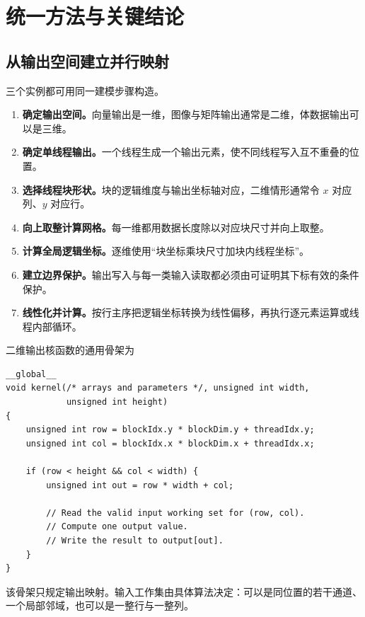 \section{统一方法与关键结论}

\subsection{从输出空间建立并行映射}

三个实例都可用同一建模步骤构造。

\begin{enumerate}
  \item \textbf{确定输出空间。}向量输出是一维，图像与矩阵输出通常是二维，体数据输出可以是三维。
  \item \textbf{确定单线程输出。}一个线程生成一个输出元素，使不同线程写入互不重叠的位置。
  \item \textbf{选择线程块形状。}块的逻辑维度与输出坐标轴对应，二维情形通常令 $x$ 对应列、$y$ 对应行。
  \item \textbf{向上取整计算网格。}每一维都用数据长度除以对应块尺寸并向上取整。
  \item \textbf{计算全局逻辑坐标。}逐维使用“块坐标乘块尺寸加块内线程坐标”。
  \item \textbf{建立边界保护。}输出写入与每一类输入读取都必须由可证明其下标有效的条件保护。
  \item \textbf{线性化并计算。}按行主序把逻辑坐标转换为线性偏移，再执行逐元素运算或线程内部循环。
\end{enumerate}

二维输出核函数的通用骨架为
\par\noindent\begin{minipage}{\linewidth}
\begin{lstlisting}[caption={二维逐输出元素核函数骨架}]
__global__
void kernel(/* arrays and parameters */, unsigned int width,
            unsigned int height)
{
    unsigned int row = blockIdx.y * blockDim.y + threadIdx.y;
    unsigned int col = blockIdx.x * blockDim.x + threadIdx.x;

    if (row < height && col < width) {
        unsigned int out = row * width + col;

        // Read the valid input working set for (row, col).
        // Compute one output value.
        // Write the result to output[out].
    }
}
\end{lstlisting}
\end{minipage}\par

该骨架只规定输出映射。输入工作集由具体算法决定：可以是同位置的若干通道、一个局部邻域，也可以是一整行与一整列。

